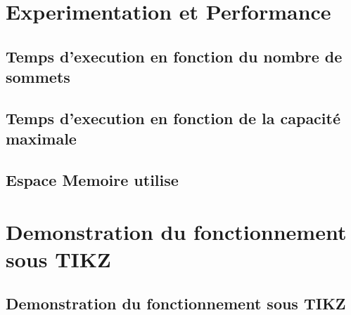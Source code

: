 \documentclass[french]{beamer}
\begin{document}
\section[Experimentation et Performance]{Experimentation et Performance}

\subsection[Temps d'execution en fonction du nombre de sommets]{Temps d'execution en fonction du nombre de sommets}



\subsection[Temps d'execution en fonction de la capacité maximale]{Temps d'execution en fonction de la capacité maximale}


\subsection[Espace Memoire utilisé]{Espace Memoire utilise}





\section[Demonstration du fonctionnement sous TIKZ]{Demonstration du fonctionnement sous TIKZ}

\subsection[Demonstration du fonctionnement sous TIKZ]{Demonstration du fonctionnement sous TIKZ}

\end{document}
